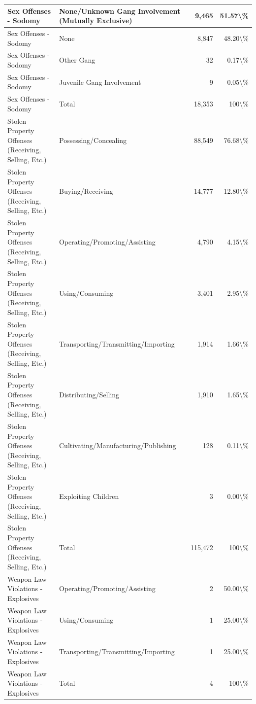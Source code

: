 \documentclass[
]{krantz}
\begin{document}
\begin{longtable}[t]{l|l|r|r}
\hline
Sex Offenses - Sodomy & None/Unknown Gang Involvement (Mutually Exclusive) & 9,465 & 51.57\textbackslash{}\%\\
\hline
Sex Offenses - Sodomy & None & 8,847 & 48.20\textbackslash{}\%\\
\hline
Sex Offenses - Sodomy & Other Gang & 32 & 0.17\textbackslash{}\%\\
\hline
Sex Offenses - Sodomy & Juvenile Gang Involvement & 9 & 0.05\textbackslash{}\%\\
\hline
Sex Offenses - Sodomy & Total & 18,353 & 100\textbackslash{}\%\\
\hline
Stolen Property Offenses (Receiving, Selling, Etc.) & Possessing/Concealing & 88,549 & 76.68\textbackslash{}\%\\
\hline
Stolen Property Offenses (Receiving, Selling, Etc.) & Buying/Receiving & 14,777 & 12.80\textbackslash{}\%\\
\hline
Stolen Property Offenses (Receiving, Selling, Etc.) & Operating/Promoting/Assisting & 4,790 & 4.15\textbackslash{}\%\\
\hline
Stolen Property Offenses (Receiving, Selling, Etc.) & Using/Consuming & 3,401 & 2.95\textbackslash{}\%\\
\hline
Stolen Property Offenses (Receiving, Selling, Etc.) & Transporting/Transmitting/Importing & 1,914 & 1.66\textbackslash{}\%\\
\hline
Stolen Property Offenses (Receiving, Selling, Etc.) & Distributing/Selling & 1,910 & 1.65\textbackslash{}\%\\
\hline
Stolen Property Offenses (Receiving, Selling, Etc.) & Cultivating/Manufacturing/Publishing & 128 & 0.11\textbackslash{}\%\\
\hline
Stolen Property Offenses (Receiving, Selling, Etc.) & Exploiting Children & 3 & 0.00\textbackslash{}\%\\
\hline
Stolen Property Offenses (Receiving, Selling, Etc.) & Total & 115,472 & 100\textbackslash{}\%\\
\hline
Weapon Law Violations - Explosives & Operating/Promoting/Assisting & 2 & 50.00\textbackslash{}\%\\
\hline
Weapon Law Violations - Explosives & Using/Consuming & 1 & 25.00\textbackslash{}\%\\
\hline
Weapon Law Violations - Explosives & Transporting/Transmitting/Importing & 1 & 25.00\textbackslash{}\%\\
\hline
Weapon Law Violations - Explosives & Total & 4 & 100\textbackslash{}\%\\

\end{longtable}
\end{document}
